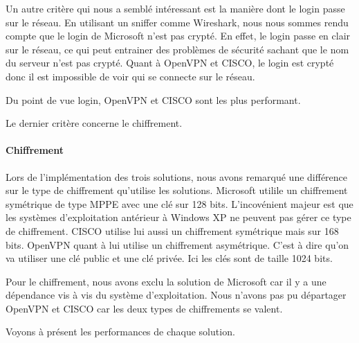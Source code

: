 Un autre critère qui nous a semblé intéressant est la manière dont le login passe sur le réseau. En utilisant un sniffer comme Wireshark, nous nous sommes rendu compte que le login de Microsoft n'est pas crypté. En effet, le login passe en clair sur le réseau, ce qui peut entrainer des problèmes de sécurité sachant que le nom du serveur n'est pas crypté. Quant à OpenVPN et CISCO, le login est crypté donc il est impossible de voir qui se connecte sur le réseau. 

Du point de vue login, OpenVPN et CISCO sont les plus performant.

Le dernier critère concerne le chiffrement.

\paragraph{Chiffrement}

Lors de l'implémentation des trois solutions, nous avons remarqué une différence sur le type de chiffrement qu'utilise les solutions.
Microsoft utilile un chiffrement symétrique de type MPPE avec une clé sur 128 bits. L'incovénient majeur est que les systèmes d'exploitation antérieur à Windows XP ne peuvent pas gérer ce type de chiffrement. CISCO utilise lui aussi un chiffrement symétrique mais sur 168 bits. 
OpenVPN quant à lui utilise un chiffrement asymétrique. C'est à dire qu'on va utiliser une clé public et une clé privée. Ici les clés sont de taille 1024 bits.

Pour le chiffrement, nous avons exclu la solution de Microsoft car il y a une dépendance vis à vis du système d'exploitation. Nous n'avons pas pu départager OpenVPN et CISCO car les deux types de chiffrements se valent.

Voyons à présent les performances de chaque solution.